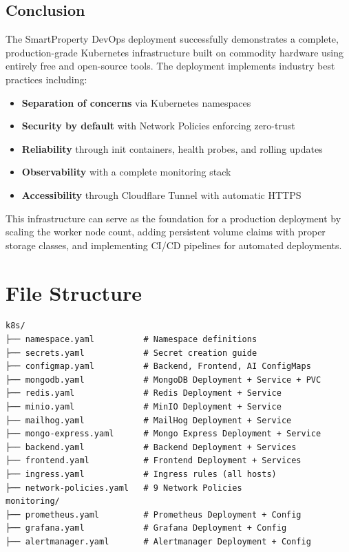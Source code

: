 \documentclass[12pt,a4paper]{report}
\begin{document}
\section{Conclusion}

The SmartProperty DevOps deployment successfully demonstrates a complete, production-grade Kubernetes infrastructure built on commodity hardware using entirely free and open-source tools. The deployment implements industry best practices including:

\begin{itemize}
  \item \textbf{Separation of concerns} via Kubernetes namespaces
  \item \textbf{Security by default} with Network Policies enforcing zero-trust
  \item \textbf{Reliability} through init containers, health probes, and rolling updates
  \item \textbf{Observability} with a complete monitoring stack
  \item \textbf{Accessibility} through Cloudflare Tunnel with automatic HTTPS
\end{itemize}

This infrastructure can serve as the foundation for a production deployment by scaling the worker node count, adding persistent volume claims with proper storage classes, and implementing CI/CD pipelines for automated deployments.

\appendix

\chapter{File Structure}

\begin{lstlisting}[style=bashstyle, caption={Kubernetes Manifests File Structure}]
k8s/
├── namespace.yaml          # Namespace definitions
├── secrets.yaml            # Secret creation guide
├── configmap.yaml          # Backend, Frontend, AI ConfigMaps
├── mongodb.yaml            # MongoDB Deployment + Service + PVC
├── redis.yaml              # Redis Deployment + Service
├── minio.yaml              # MinIO Deployment + Service
├── mailhog.yaml            # MailHog Deployment + Service
├── mongo-express.yaml      # Mongo Express Deployment + Service
├── backend.yaml            # Backend Deployment + Services
├── frontend.yaml           # Frontend Deployment + Services
├── ingress.yaml            # Ingress rules (all hosts)
├── network-policies.yaml   # 9 Network Policies
monitoring/
├── prometheus.yaml         # Prometheus Deployment + Config
├── grafana.yaml            # Grafana Deployment + Config
├── alertmanager.yaml       # Alertmanager Deployment + Config
\end{lstlisting}
\end{document}
